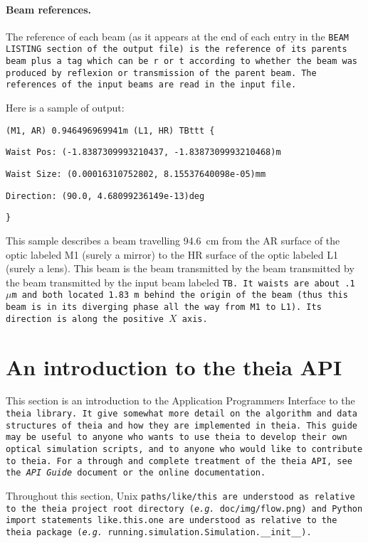 \documentclass{article}
\begin{document}
\paragraph{Beam references.}The reference of each beam (as it appears at the end of each entry in the \tt{BEAM LISTING} section of the output file) is the reference of its parents beam plus a tag which can be \tt{r} or \tt{t} according to whether the beam was produced by reflexion or transmission of the parent beam. The references of the input beams are read in the input file.


Here is a sample of output:

\tt{(M1, AR) 0.946496969941m (L1, HR) TBttt \{}

	\quad	\tt{Waist Pos: (-1.8387309993210437, -1.8387309993210468)m}

	\quad	\tt{Waist Size: (0.00016310752802, 8.15537640098e-05)mm}

	\quad	\tt{Direction: (90.0, 4.68099236149e-13)deg}

	\tt{\}}

This sample describes a beam travelling 94.6~cm from the AR surface of the optic labeled M1 (surely a mirror) to the HR surface of the optic labeled L1 (surely a lens). This beam is the beam transmitted by the beam transmitted by the beam transmitted by the input beam labeled \tt{TB}. It waists are about .1~$\mu$m and both located 1.83~m behind the origin of the beam (thus this beam is in its diverging phase all the way from M1 to L1). Its direction is along the positive $X$ axis.

\newpage
\section{An introduction to the theia API}

This section is an introduction to the Application Programmers Interface to the \tt{theia} library. It give somewhat more detail on the algorithm and data structures of theia and how they are implemented in \tt{theia}. This guide may be useful to anyone who wants to use \tt{theia} to develop their own optical simulation scripts, and to anyone who would like to contribute to \tt{theia}. For a through and complete treatment of the \tt{theia} API, see the \textit{API Guide} document or the online documentation.

Throughout this section, Unix \tt{paths/like/this} are understood as relative to the theia project root directory (\textit{e.g.} \tt{doc/img/flow.png}) and Python import statements \tt{like.this.one} are understood as relative to the theia package (\textit{e.g.} \tt{running.simulation.Simulation.\_\_init\_\_}).
\end{document}
